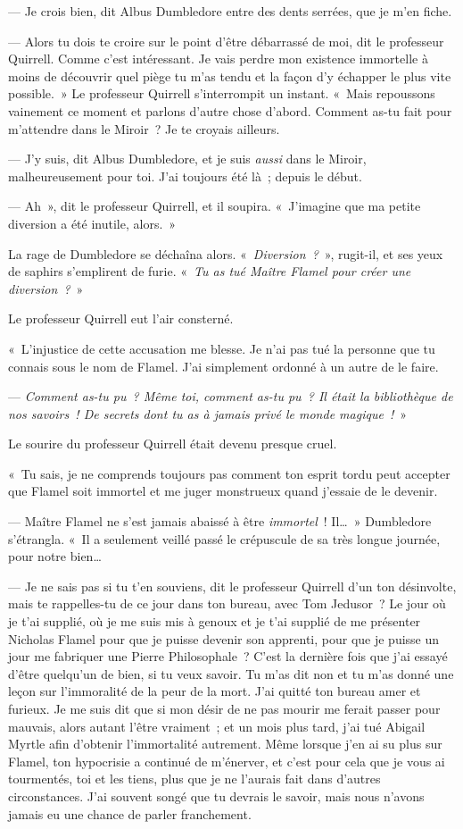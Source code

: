 --- Je crois bien, dit Albus Dumbledore entre des dents serrées, que je m'en fiche.

--- Alors tu dois te croire sur le point d'être débarrassé de moi, dit le professeur Quirrell. Comme c'est intéressant. Je vais perdre mon existence immortelle à moins de découvrir quel piège tu m'as tendu et la façon d'y échapper le plus vite possible.~» Le professeur Quirrell s'interrompit un instant. «~Mais repoussons vainement ce moment et parlons d'autre chose d'abord. Comment as-tu fait pour m'attendre dans le Miroir~? Je te croyais ailleurs.

--- J'y suis, dit Albus Dumbledore, et je suis \emph{aussi} dans le Miroir, malheureusement pour toi. J'ai toujours été là~; depuis le début.

--- Ah~», dit le professeur Quirrell, et il soupira. «~J'imagine que ma petite diversion a été inutile, alors.~»

La rage de Dumbledore se déchaîna alors. «~\emph{Diversion~?}~», rugit-il, et ses yeux de saphirs s'emplirent de furie. «~\emph{Tu as tué Maître Flamel pour créer une diversion~?}~»

Le professeur Quirrell eut l'air consterné.

«~L'injustice de cette accusation me blesse. Je n'ai pas tué la personne que tu connais sous le nom de Flamel. J'ai simplement ordonné à un autre de le faire.

--- \emph{Comment as-tu pu~? Même toi, comment as-tu pu~? Il était la bibliothèque de nos savoirs~! De secrets dont tu as à jamais privé le monde magique~!}~»

Le sourire du professeur Quirrell était devenu presque cruel.

«~Tu sais, je ne comprends toujours pas comment ton esprit tordu peut accepter que Flamel soit immortel et me juger monstrueux quand j'essaie de le devenir.

--- Maître Flamel ne s'est jamais abaissé à être \emph{immortel}~! Il…~» Dumbledore s'étrangla. «~Il a seulement veillé passé le crépuscule de sa très longue journée, pour notre bien…

--- Je ne sais pas si tu t'en souviens, dit le professeur Quirrell d'un ton désinvolte, mais te rappelles-tu de ce jour dans ton bureau, avec Tom Jedusor~? Le jour où je t'ai supplié, où je me suis mis à genoux et je t'ai supplié de me présenter Nicholas Flamel pour que je puisse devenir son apprenti, pour que je puisse un jour me fabriquer une Pierre Philosophale~? C'est la dernière fois que j'ai essayé d'être quelqu'un de bien, si tu veux savoir. Tu m'as dit non et tu m'as donné une leçon sur l'immoralité de la peur de la mort. J'ai quitté ton bureau amer et furieux. Je me suis dit que si mon désir de ne pas mourir me ferait passer pour mauvais, alors autant l'être vraiment~; et un mois plus tard, j'ai tué Abigail Myrtle afin d'obtenir l'immortalité autrement. Même lorsque j'en ai su plus sur Flamel, ton hypocrisie a continué de m'énerver, et c'est pour cela que je vous ai tourmentés, toi et les tiens, plus que je ne l'aurais fait dans d'autres circonstances. J'ai souvent songé que tu devrais le savoir, mais nous n'avons jamais eu une chance de parler franchement.

